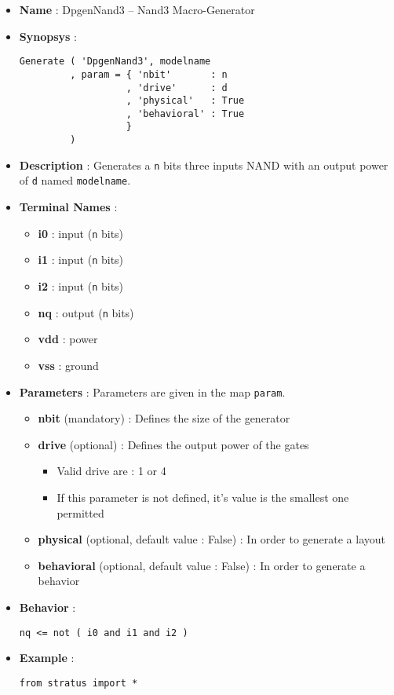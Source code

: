 \begin{itemize}
    \item \textbf{Name} : DpgenNand3 -- Nand3 Macro-Generator
    \item \textbf{Synopsys} :
\begin{verbatim}
Generate ( 'DpgenNand3', modelname
         , param = { 'nbit'       : n
                   , 'drive'      : d
                   , 'physical'   : True
                   , 'behavioral' : True                   
                   }
         )
\end{verbatim}
    \item \textbf{Description} : Generates a \verb-n- bits three inputs NAND with an output power of \verb-d- named \verb-modelname-.
    \item \textbf{Terminal Names} :
    \begin{itemize}
        \item \textbf{i0} : input (\verb-n- bits)
        \item \textbf{i1} : input (\verb-n- bits)
        \item \textbf{i2} : input (\verb-n- bits)
        \item \textbf{nq} : output (\verb-n- bits)
        \item \textbf{vdd} : power
        \item \textbf{vss} : ground
    \end{itemize}
    \item \textbf{Parameters} : Parameters are given in the map \verb-param-.
    \begin{itemize}
        \item \textbf{nbit} (mandatory) : Defines the size of the generator
        \item \textbf{drive} (optional) : Defines the output power of the gates
        \begin{itemize}
            \item Valid drive are : 1 or 4
            \item If this parameter is not defined, it's value is the smallest one permitted
        \end{itemize}
        \item \textbf{physical} (optional, default value : False) : In order to generate a layout
        \item \textbf{behavioral} (optional, default value : False) : In order to generate a behavior
    \end{itemize}
    \item \textbf{Behavior} :
\begin{verbatim}
nq <= not ( i0 and i1 and i2 )
\end{verbatim}
    \item \textbf{Example} :
\begin{verbatim}
from stratus import *


\end{verbatim}
\end{itemize}
